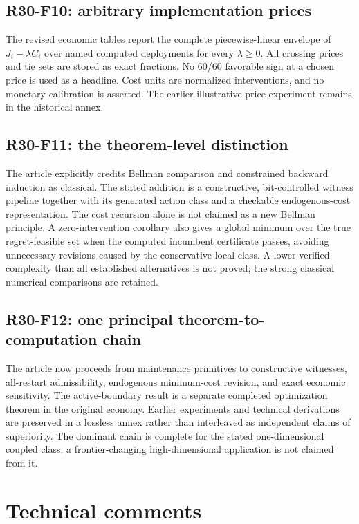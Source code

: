\subsection{R30-F10: arbitrary implementation prices}
The revised economic tables report the complete piecewise-linear envelope of $J_i-\lambda C_i$ over named computed deployments for every $\lambda\ge0$. All crossing prices and tie sets are stored as exact fractions. No 60/60 favorable sign at a chosen price is used as a headline. Cost units are normalized interventions, and no monetary calibration is asserted. The earlier illustrative-price experiment remains in the historical annex.

\subsection{R30-F11: the theorem-level distinction}
The article explicitly credits Bellman comparison and constrained backward induction as classical. The stated addition is a constructive, bit-controlled witness pipeline together with its generated action class and a checkable endogenous-cost representation. The cost recursion alone is not claimed as a new Bellman principle. A zero-intervention corollary also gives a global minimum over the true regret-feasible set when the computed incumbent certificate passes, avoiding unnecessary revisions caused by the conservative local class. A lower verified complexity than all established alternatives is not proved; the strong classical numerical comparisons are retained.

\subsection{R30-F12: one principal theorem-to-computation chain}
The article now proceeds from maintenance primitives to constructive witnesses, all-restart admissibility, endogenous minimum-cost revision, and exact economic sensitivity. The active-boundary result is a separate completed optimization theorem in the original economy. Earlier experiments and technical derivations are preserved in a lossless annex rather than interleaved as independent claims of superiority. The dominant chain is complete for the stated one-dimensional coupled class; a frontier-changing high-dimensional application is not claimed from it.

\section{Technical comments}
